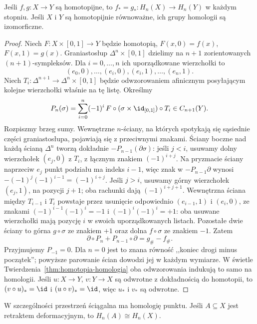\begin{twierdzenie}
\label{thm:homotopia-singularna}
Jeśli $f,g:X\to Y$ są homotopijne, to
$f_*=g_*:H_n(X)\to H_n(Y)$ w każdym stopniu.
Jeśli $X$ i $Y$ są homotopijnie równoważne,
ich grupy homologii są izomorficzne.
\end{twierdzenie}
\begin{proof}
Niech $F:X\times[0,1]\to Y$ będzie
homotopią, $F(x,0)=f(x)$,
$F(x,1)=g(x)$.
Graniastosłup $\Delta^n\times[0,1]$
dzielimy na $n+1$ zorientowanych
$(n+1)$-sympleksów. Dla $i=0,\ldots,n$
ich uporządkowane wierzchołki to
\[
 (e_0,0),\ldots,(e_i,0),
 (e_i,1),\ldots,(e_n,1).
\]
Niech $T_i:\Delta^{n+1}\to
\Delta^n\times[0,1]$ będzie odwzorowaniem
afinicznym posyłającym kolejne wierzchołki
właśnie na tę listę. Określmy
\[
 P_n(\sigma)=\sum_{i=0}^n(-1)^i\,
 F\circ(\sigma\times\id_{[0,1]})\circ T_i
 \in C_{n+1}(Y).
\]
Rozpiszmy brzeg sumy. Wewnętrzne
$n$-ściany, na których spotykają się
sąsiednie części graniastosłupa,
pojawiają się z przeciwnymi znakami.
Ściany boczne nad każdą ścianą
$\Delta^n$ tworzą dokładnie
$-P_{n-1}(\partial\sigma)$:
jeśli $j<i$, usuwamy dolny wierzchołek $(e_j,0)$
z $T_i$, z łącznym znakiem $(-1)^{i+j}$.
Na pryzmacie ściany naprzeciw $e_j$ punkt podziału ma indeks $i-1$,
więc znak w $-P_{n-1}\partial$ wynosi
$-(-1)^j(-1)^{i-1}=(-1)^{i+j}$.
Jeśli $j>i$, usuwamy górny wierzchołek $(e_j,1)$,
na pozycji $j+1$; oba rachunki dają $(-1)^{i+j+1}$.
Wewnętrzna ściana między $T_{i-1}$ i $T_i$ powstaje
przez usunięcie odpowiednio $(e_{i-1},1)$ i $(e_i,0)$,
ze znakami $(-1)^{i-1}(-1)^i=-1$ i
$(-1)^i(-1)^i=+1$: oba usuwane wierzchołki
mają pozycję $i$ w swoich uporządkowanych listach.
Pozostałe dwie ściany to górna
$g\circ\sigma$ ze znakiem $+1$
oraz dolna $f\circ\sigma$ ze
znakiem $-1$. Zatem
\begin{equation}\label{eq:prism-identity}
 \partial\circ P_n+P_{n-1}\circ\partial
 =g_\#-f_\#.
\end{equation}
Przyjmujemy $P_{-1}=0$. Dla $n=0$ jest to znana równość
,,koniec drogi minus początek'';
powyższe parowanie ścian dowodzi
jej w każdym wymiarze. W świetle
Twierdzenia~\ref{thm:homotopia-homologia}
oba odwzorowania indukują to samo na homologii.
Jeśli $u:X\to Y$, $v:Y\to X$
są odwrotne z dokładnością do homotopii,
to $(v\circ u)_*=\id$ i $(u\circ v)_*=\id$,
więc $u_*$ i $v_*$ są odwrotne.
\end{proof}

W szczególności przestrzeń ściągalna
ma homologię punktu. Jeśli
$A\subseteq X$ jest retraktem
deformacyjnym, to $H_n(A)\cong H_n(X)$.

